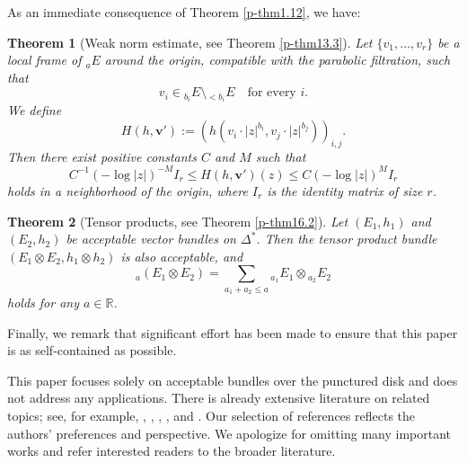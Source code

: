 \documentclass[12pt,twoside]{amsart}
\newtheorem{thm}{Theorem}[section]
\theoremstyle{definition}
\begin{document}
As an immediate consequence of 
Theorem \ref{p-thm1.12}, we have: 

\begin{thm}[Weak norm estimate, see Theorem \ref{p-thm13.3}]\label{p-thm1.13}
Let $\{v_1, \ldots, v_r\}$ be a local frame 
of ${}_a E$ around the origin, compatible with the parabolic filtration, such that 
\[
v_i \in {}_{b_i} E \setminus {}_{<b_i} E \quad \text{for every } i.
\] 
We define  
\[
H(h, \bm v') :=\left( h(v_i\cdot |z|^{b_i}, v_j\cdot |z|^{b_j})\right)_{i, j}. 
\]
Then there exist positive constants $C$ and $M$ such that
\[
C^{-1}(-\log |z|)^{-M} I_r \leq H(h, \bm{v}')(z) \leq C(-\log |z|)^M I_r
\]
holds in a neighborhood of the origin, where $I_r$ is the identity matrix of size $r$.
\end{thm}

\begin{thm}[Tensor products, see Theorem \ref{p-thm16.2}]\label{p-thm1.14}
Let $(E_1, h_1)$ and $(E_2, h_2)$ 
be acceptable vector bundles on $\Delta^*$. 
Then the tensor product bundle $(E_1 \otimes E_2, h_1 \otimes h_2)$ is also acceptable, and
\[
{}_a(E_1 \otimes E_2) = \sum_{a_1 + a_2 \leq a} {}_{a_1} E_1 \otimes {}_{a_2} E_2
\]
holds for any $a \in \mathbb{R}$.
\end{thm}

Finally, we remark that significant 
effort has been made to ensure that this paper is as self-contained as possible.

\medskip 

This paper focuses solely 
on acceptable bundles over the punctured 
disk and does not address any applications. 
There is already extensive 
literature on related topics; see, 
for example, \cite{biquard1}, \cite{biquard2}, \cite{bb}, 
\cite{sabbah-schnell1}, and \cite{sabbah-schnell2}. 
Our selection of references 
reflects the authors' preferences 
and perspective. We apologize for 
omitting many important works and 
refer interested readers to the broader literature.

\medskip
\end{document}

